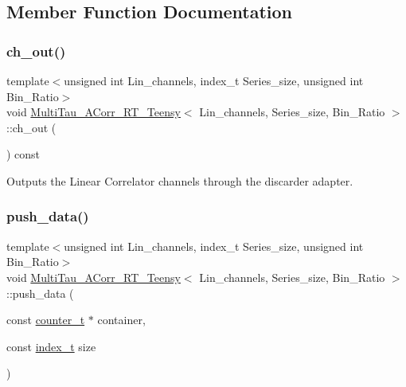 \subsection{Member Function Documentation}
\mbox{\label{classMultiTau__ACorr__RT__Teensy_a37a29725971f15305398ac7c9c360eac}} 
\subsubsection{\texorpdfstring{ch\+\_\+out()}{ch\_out()}}
{\footnotesize\ttfamily template$<$unsigned int Lin\+\_\+channels, index\+\_\+t Series\+\_\+size, unsigned int Bin\+\_\+\+Ratio$>$ \\
void \hyperlink{classMultiTau__ACorr__RT__Teensy}{Multi\+Tau\+\_\+\+A\+Corr\+\_\+\+R\+T\+\_\+\+Teensy}$<$ Lin\+\_\+channels, Series\+\_\+size, Bin\+\_\+\+Ratio $>$\+::ch\+\_\+out (\begin{DoxyParamCaption}{ }\end{DoxyParamCaption}) const\hspace{0.3cm}{\ttfamily [inline]}}



Outputs the Linear Correlator channels through the discarder adapter. 

\mbox{\label{classMultiTau__ACorr__RT__Teensy_ae36ab4fb6f646d068e638ab7e4ec9da8}} 
\subsubsection{\texorpdfstring{push\+\_\+data()}{push\_data()}}
{\footnotesize\ttfamily template$<$unsigned int Lin\+\_\+channels, index\+\_\+t Series\+\_\+size, unsigned int Bin\+\_\+\+Ratio$>$ \\
void \hyperlink{classMultiTau__ACorr__RT__Teensy}{Multi\+Tau\+\_\+\+A\+Corr\+\_\+\+R\+T\+\_\+\+Teensy}$<$ Lin\+\_\+channels, Series\+\_\+size, Bin\+\_\+\+Ratio $>$\+::push\+\_\+data (\begin{DoxyParamCaption}\item[{const \hyperlink{types_8hpp_a22f279793847eba127de149437848c48}{counter\+\_\+t} $\ast$}]{container,  }\item[{const \hyperlink{types_8hpp_a7c40bb931c31595ed6308605f4537447}{index\+\_\+t}}]{size }\end{DoxyParamCaption})\hspace{0.3cm}{\ttfamily [inline]}}



